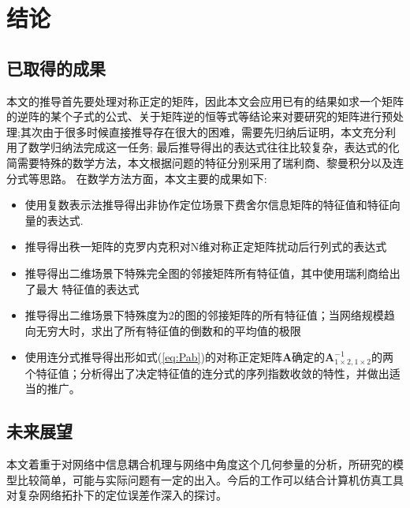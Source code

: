 \chapter{结论}\label{cha:content5}
  \section{已取得的成果}
    本文的推导首先要处理对称正定的矩阵，因此本文会应用已有的结果如求一个矩阵的逆阵的某个子式的公式、关于矩阵逆的恒等式等结论来对要研究的矩阵进行预处理;其次由于很多时候直接推导存在很大的困难，需要先归纳后证明，本文充分利用了数学归纳法完成这一任务;
  最后推导得出的表达式往往比较复杂，表达式的化简需要特殊的数学方法，本文根据问题的特征分别采用了瑞利商、黎曼积分以及连分式等思路。
  在数学方法方面，本文主要的成果如下:
  \begin{itemize}
  \item
    使用复数表示法推导得出非协作定位场景下费舍尔信息矩阵的特征值和特征向量的表达式.
  \item
    推导得出秩一矩阵的克罗内克积对N维对称正定矩阵扰动后行列式的表达式
  \item
    推导得出二维场景下特殊完全图的邻接矩阵所有特征值，其中使用瑞利商给出了最大 特征值的表达式
  \item 推导得出二维场景下特殊度为2的图的邻接矩阵的所有特征值；当网络规模趋向无穷大时，求出了所有特征值的倒数和的平均值的极限
  \item 使用连分式推导得出形如式(\ref{eq:Pab})的对称正定矩阵$\bm{A}$确定的$\bm{A}^{-1}_{1\times2,1\times2}$的两个特征值；分析得出了决定特征值的连分式的序列指数收敛的特性，并做出适当的推广。
  \end{itemize}
  
  \section{未来展望}
  本文着重于对网络中信息耦合机理与网络中角度这个几何参量的分析，所研究的模型比较简单，可能与实际问题有一定的出入。今后的工作可以结合计算机仿真工具对复杂网络拓扑下的定位误差作深入的探讨。

